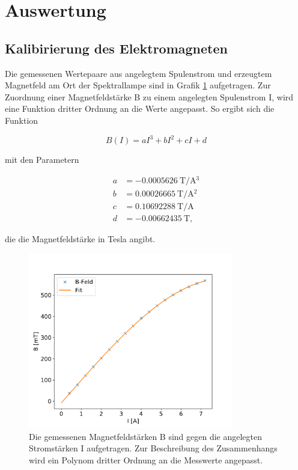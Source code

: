 \newpage
\section{Auswertung}

    \subsection{Kalibirierung des Elektromagneten}
        Die gemessenen Wertepaare aus angelegtem Spulenstrom und erzeugtem Magnetfeld am Ort der Spektrallampe sind in Grafik \ref{fig:Magnetfeld} aufgetragen. Zur Zuordnung einer Magnetfeldstärke B zu einem 
        angelegten Spulenstrom I, wird eine Funktion dritter Ordnung an die Werte angepasst. So ergibt sich die Funktion

        \begin{equation}
            B(I) = aI^3 + bI^2 + cI + d
        \end{equation}
        
        mit den Parametern 

        \begin{align}
            a &=\SI{-0.0005626}{\tesla \per \ampere^3} \\
            b &=\SI{0.00026665}{\tesla \per \ampere^2} \\
            c &=\SI{0.10692288}{\tesla \per \ampere}   \\
            d &=\SI{-0.00662435}{\tesla },
        \end{align}
        
        die die Magnetfeldstärke in Tesla angibt.
        \FloatBarrier

        \begin{figure}[h]
          \centering
          \includegraphics[width = 0.8\textwidth]{magnetfeld.pdf}
          \caption{Die gemessenen Magnetfeldstärken B sind gegen die angelegten Stromstärken I aufgetragen. Zur Beschreibung des Zusammenhangs wird ein Polynom dritter Ordnung an die Messwerte angepasst.}
          \label{fig:Magnetfeld}
        \end{figure}
    
